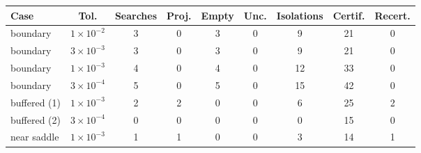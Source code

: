 \begin{tabular}{@{}lcccccccc@{}}
\toprule
Case & Tol. & Searches & Proj. & Empty & Unc. & Isolations & Certif. & Recert. \\
\midrule
boundary & $1\times10^{-2}$ & 3 & 0 & 3 & 0 & 9 & 21 & 0 \\
boundary & $3\times10^{-3}$ & 3 & 0 & 3 & 0 & 9 & 21 & 0 \\
boundary & $1\times10^{-3}$ & 4 & 0 & 4 & 0 & 12 & 33 & 0 \\
boundary & $3\times10^{-4}$ & 5 & 0 & 5 & 0 & 15 & 42 & 0 \\
buffered (1) & $1\times10^{-3}$ & 2 & 2 & 0 & 0 & 6 & 25 & 2 \\
buffered (2) & $3\times10^{-4}$ & 0 & 0 & 0 & 0 & 0 & 15 & 0 \\
near saddle & $1\times10^{-3}$ & 1 & 1 & 0 & 0 & 3 & 14 & 1 \\
\bottomrule
\end{tabular}
